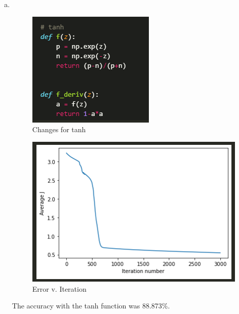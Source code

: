 \documentclass[12pt]{article}
\begin{document}
\begin{enumerate}[(a)]
	\item \,
		\begin{figure}[H]
			\centering
			\includegraphics[width=\textwidth/2]{images/7cchange.png}
			\caption{Changes for tanh}
			\label{fig:7:c:changes}
		\end{figure}
		\begin{figure}[H]
			\centering
			\includegraphics[width=\textwidth/2]{images/7cgraph.png}
			\caption{Error v. Iteration}
			\label{fig:7:c:graph}
		\end{figure}
		The accuracy with the tanh function was 88.873\%.
		

\end{enumerate}
\end{document}
